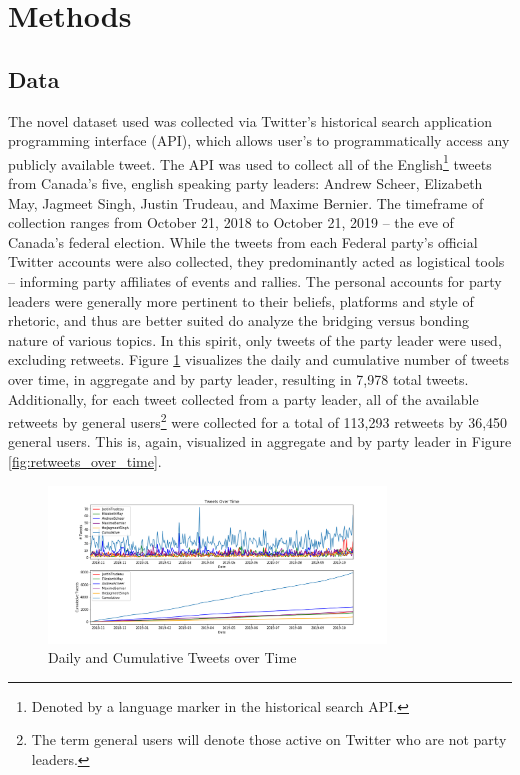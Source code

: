 \section{Methods}

\subsection{Data}

The novel dataset used was collected via Twitter's historical search application
programming interface (API), which allows user's to programmatically access any
publicly available tweet. The API was used to collect all of the
English\footnote{Denoted by a language marker in the historical search API.}
tweets from Canada's five, english speaking party leaders: Andrew Scheer,
Elizabeth May, Jagmeet Singh, Justin Trudeau, and Maxime Bernier. The timeframe
of collection ranges from October 21, 2018 to October 21, 2019 -- the eve of
Canada’s federal election. While the tweets from each Federal party’s official
Twitter accounts were also collected, they predominantly acted as logistical
tools – informing party affiliates of events and rallies. The personal accounts
for party leaders were generally more pertinent to their beliefs, platforms and
style of rhetoric, and thus are better suited do analyze the bridging versus
bonding nature of various topics. In this spirit, only tweets of the party
leader were used, excluding retweets. Figure \ref{fig:tweets_over_time}
visualizes the daily and cumulative number of tweets over time, in aggregate and
by party leader, resulting in 7,978 total tweets. Additionally, for each tweet collected from a party leader, all of the available
retweets by general users\footnote{The term general users will denote those
active on Twitter who are not party leaders.} were collected for a total of
113,293 retweets by 36,450 general users. This is, again, visualized in
aggregate and by party leader in Figure \ref{fig:retweets_over_time}.

\begin{figure}[h!]
  \centering
  \includegraphics[width=0.8\textwidth]{figures/tweets_over_time}
  \caption[Daily and Cumulative Tweets over Time]{Daily and Cumulative Tweets over Time}
  \label{fig:tweets_over_time}
\end{figure}

